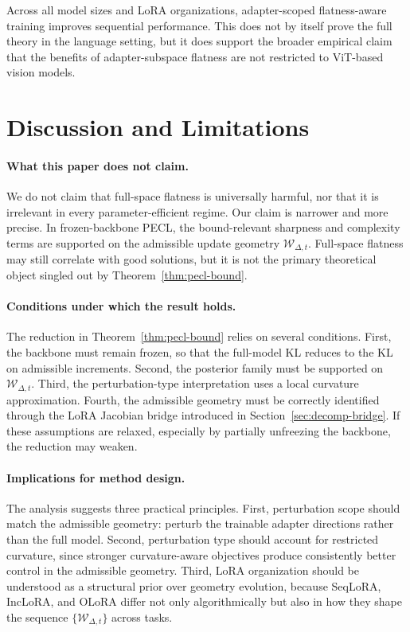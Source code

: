 \documentclass[10pt]{article} %
\begin{document}
Across all model sizes and LoRA organizations, adapter-scoped flatness-aware training improves sequential performance.
This does not by itself prove the full theory in the language setting, but it does support the broader empirical claim that the benefits of adapter-subspace flatness are not restricted to ViT-based vision models.

\section{Discussion and Limitations}
\label{sec:discussion}

\paragraph{What this paper does not claim.}
We do not claim that full-space flatness is universally harmful, nor that it is irrelevant in every parameter-efficient regime.
Our claim is narrower and more precise.
In frozen-backbone PECL, the bound-relevant sharpness and complexity terms are supported on the admissible update geometry $\mathcal{W}_{\Delta,t}$.
Full-space flatness may still correlate with good solutions, but it is not the primary theoretical object singled out by Theorem~\ref{thm:pecl-bound}.

\paragraph{Conditions under which the result holds.}
The reduction in Theorem~\ref{thm:pecl-bound} relies on several conditions.
First, the backbone must remain frozen, so that the full-model KL reduces to the KL on admissible increments.
Second, the posterior family must be supported on $\mathcal{W}_{\Delta,t}$.
Third, the perturbation-type interpretation uses a local curvature approximation.
Fourth, the admissible geometry must be correctly identified through the LoRA Jacobian bridge introduced in Section~\ref{sec:decomp-bridge}.
If these assumptions are relaxed, especially by partially unfreezing the backbone, the reduction may weaken.

\paragraph{Implications for method design.}
The analysis suggests three practical principles.
First, perturbation scope should match the admissible geometry: perturb the trainable adapter directions rather than the full model.
Second, perturbation type should account for restricted curvature, since stronger curvature-aware objectives produce consistently better control in the admissible geometry.
Third, LoRA organization should be understood as a structural prior over geometry evolution, because SeqLoRA, IncLoRA, and OLoRA differ not only algorithmically but also in how they shape the sequence $\{\mathcal{W}_{\Delta,t}\}$ across tasks.
\end{document}
